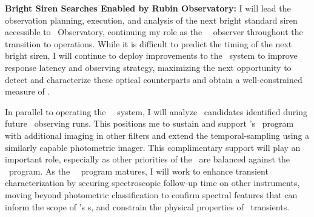 \textbf{Bright Siren Searches Enabled by Rubin Observatory:}
I will lead the observation planning, execution, and analysis of the next bright standard siren accessible to \Rubin\ Observatory, 
continuing my role as the \Rubin\ \ToO\ observer throughout the transition to operations.
While it is difficult to predict the timing of the next bright siren, I will continue to deploy improvements to the \ToO\ system to improve response latency and observing strategy, maximizing the next opportunity to detect and characterize these 
optical counterparts and obtain a well-constrained measure of \Ho.

In parallel to operating the \Rubin\ \ToO\ system, I will analyze \DESGW\ candidates identified during future \LVK\ observing runs. This positions me to sustain and support \Rubin's \ToO\ program with additional imaging in other filters and extend the temporal-sampling using a similarly capable photometric imager. This complimentary support will play an important role, especially as other priorities of the \LSST\ are balanced against the \ToO\ program.
As the \LSST\ \ToO\ program matures, I will work to enhance transient characterization by securing spectroscopic follow-up time on other instruments, moving beyond photometric classification to confirm spectral features that can inform the scope of \Rubin's \ToO s, and constrain the physical properties of \LSST\ transients.%

